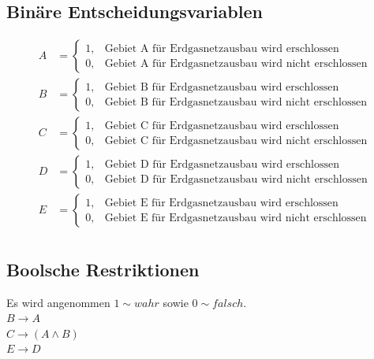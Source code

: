 \documentclass[a4paper,11pt]{article}
\begin{document}
\subsection*{Binäre Entscheidungsvariablen}
\begin{align*}
    A &= \begin{cases}
        1, & \text{Gebiet A für Erdgasnetzausbau wird erschlossen} \\
        0, & \text{Gebiet A für Erdgasnetzausbau wird nicht erschlossen}
    \end{cases} \\
    B &= \begin{cases}
        1, & \text{Gebiet B für Erdgasnetzausbau wird erschlossen} \\
        0, & \text{Gebiet B für Erdgasnetzausbau wird nicht erschlossen}
    \end{cases} \\
    C &= \begin{cases}
        1, & \text{Gebiet C für Erdgasnetzausbau wird erschlossen} \\
        0, & \text{Gebiet C für Erdgasnetzausbau wird nicht erschlossen}
    \end{cases} \\
    D &= \begin{cases}
        1, & \text{Gebiet D für Erdgasnetzausbau wird erschlossen} \\
        0, & \text{Gebiet D für Erdgasnetzausbau wird nicht erschlossen}
    \end{cases} \\
    E &= \begin{cases}
        1, & \text{Gebiet E für Erdgasnetzausbau wird erschlossen} \\
        0, & \text{Gebiet E für Erdgasnetzausbau wird nicht erschlossen}
    \end{cases} \\
\end{align*}

\pagebreak

\subsection*{Boolsche Restriktionen}
Es wird angenommen $1 \sim wahr$ sowie $0 \sim falsch$. \\

$B \to A$ \\
$C \to (A \land B)$ \\
$E \to D$ \\
\end{document}
